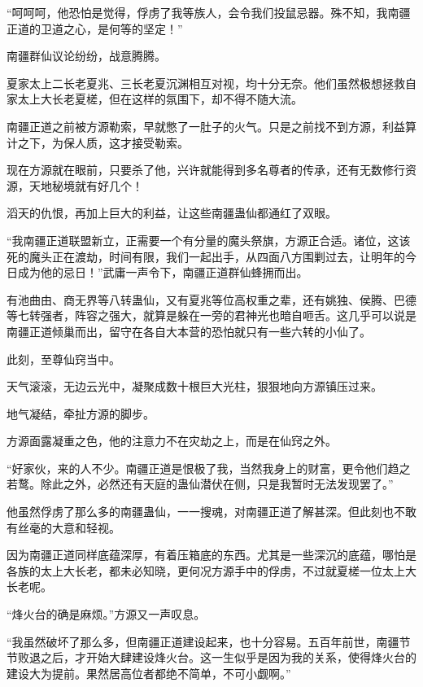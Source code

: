 \begin{this_body}
“呵呵呵，他恐怕是觉得，俘虏了我等族人，会令我们投鼠忌器。殊不知，我南疆正道的卫道之心，是何等的坚定！”

南疆群仙议论纷纷，战意腾腾。

夏家太上二长老夏兆、三长老夏沉渊相互对视，均十分无奈。他们虽然极想拯救自家太上大长老夏槎，但在这样的氛围下，却不得不随大流。

南疆正道之前被方源勒索，早就憋了一肚子的火气。只是之前找不到方源，利益算计之下，为保人质，这才接受勒索。

现在方源就在眼前，只要杀了他，兴许就能得到多名尊者的传承，还有无数修行资源，天地秘境就有好几个！

滔天的仇恨，再加上巨大的利益，让这些南疆蛊仙都通红了双眼。

“我南疆正道联盟新立，正需要一个有分量的魔头祭旗，方源正合适。诸位，这该死的魔头正在渡劫，时间有限，我们一起出手，从四面八方围剿过去，让明年的今日成为他的忌日！”武庸一声令下，南疆正道群仙蜂拥而出。

有池曲由、商无界等八转蛊仙，又有夏兆等位高权重之辈，还有姚独、侯腾、巴德等七转强者，阵容之强大，就算是躲在一旁的君神光也暗自咂舌。这几乎可以说是南疆正道倾巢而出，留守在各自大本营的恐怕就只有一些六转的小仙了。

此刻，至尊仙窍当中。

天气滚滚，无边云光中，凝聚成数十根巨大光柱，狠狠地向方源镇压过来。

地气凝结，牵扯方源的脚步。

方源面露凝重之色，他的注意力不在灾劫之上，而是在仙窍之外。

“好家伙，来的人不少。南疆正道是恨极了我，当然我身上的财富，更令他们趋之若鹜。除此之外，必然还有天庭的蛊仙潜伏在侧，只是我暂时无法发现罢了。”

他虽然俘虏了那么多的南疆蛊仙，一一搜魂，对南疆正道了解甚深。但此刻也不敢有丝毫的大意和轻视。

因为南疆正道同样底蕴深厚，有着压箱底的东西。尤其是一些深沉的底蕴，哪怕是各族的太上大长老，都未必知晓，更何况方源手中的俘虏，不过就夏槎一位太上大长老呢。

“烽火台的确是麻烦。”方源又一声叹息。

“我虽然破坏了那么多，但南疆正道建设起来，也十分容易。五百年前世，南疆节节败退之后，才开始大肆建设烽火台。这一生似乎是因为我的关系，使得烽火台的建设大为提前。果然居高位者都绝不简单，不可小觑啊。”

\end{this_body}

